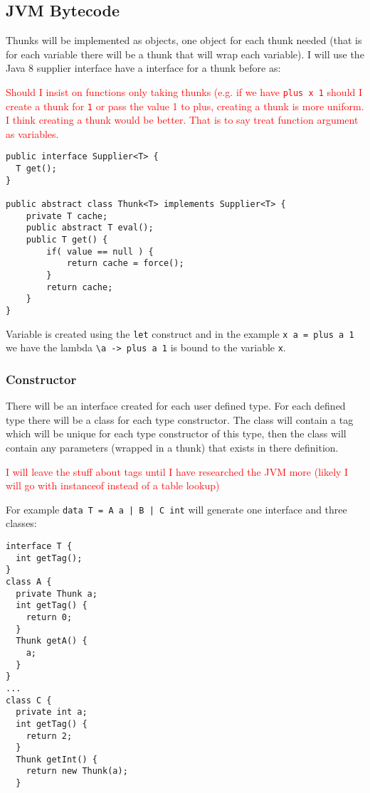 \documentclass[12pt,a4paper,twoside]{article}
\begin{document}
\subsection{JVM Bytecode}

Thunks will be implemented as objects, one object for each thunk needed 
(that is for each variable there will be a thunk that will wrap each variable).
I will use the Java 8 supplier interface have a interface for a thunk before as:

\textcolor{red}{Should I insist on functions only taking thunks (e.g. if we have \texttt{plus x 1} should I 
create a thunk for \texttt{1} or pass the value 1 to plus, creating a thunk is more uniform. I think creating 
a thunk would be better. That is to say treat function argument as variables.}

\begin{verbatim}
public interface Supplier<T> {
  T get();
}

public abstract class Thunk<T> implements Supplier<T> {
    private T cache;
    public abstract T eval();
    public T get() {
        if( value == null ) {
            return cache = force();
        }
        return cache;
    }
}
\end{verbatim}

Variable is created using the \texttt{let} construct and in the example \texttt{x a = plus a 1} we have
the lambda \texttt{\textbackslash a -> plus a 1} is bound to the variable \texttt{x}.

\subsubsection{Constructor}

There will be an interface created for each user defined type. 
For each defined type there will be a class for each type constructor. The class will contain a tag which will be unique for each type constructor of this type,
then the class will contain any parameters (wrapped in a thunk) that exists in there definition.

\textcolor{red}{I will leave the stuff about tags until I have researched the JVM more (likely I will go with 
instanceof instead of a table lookup)}

For example \texttt{data T = A a | B | C int} will generate one interface and three classes:

\begin{verbatim}
interface T {
  int getTag();
}
class A {
  private Thunk a;
  int getTag() {
    return 0;
  }
  Thunk getA() {
    a;
  }
}
...
class C {
  private int a;
  int getTag() {
    return 2;
  }
  Thunk getInt() {
    return new Thunk(a);
  }
\end{verbatim}
\end{document}
